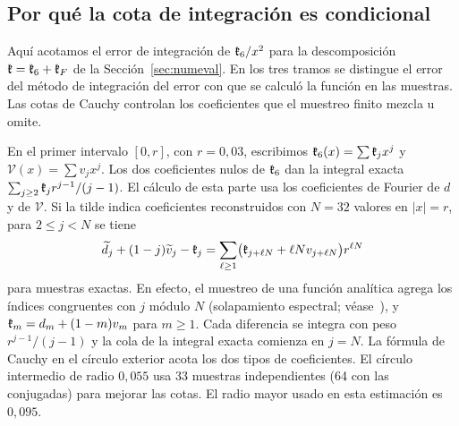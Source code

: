 \subsection{Por qué la cota de integración es condicional}
Aquí acotamos el error de integración de $\mathfrak{k}_6/x^2$ para la descomposición
 $\mathfrak{k}=\mathfrak{k}_6+\mathfrak{k}_F$ de la
Sección~\ref{sec:numeval}. En los tres tramos se distingue el error del método de integración del
error con que se calculó la función en las muestras. Las cotas de Cauchy controlan los coeficientes
que el muestreo finito mezcla u omite.

En el primer intervalo $[0,r]$, con $r=0{,}03$, escribimos $\mathfrak{k}_6(x)=\sum \mathfrak{k}_jx^j$ y $\mathcal
 V(x)=\sum
v_jx^j$. Los dos coeficientes nulos de $\mathfrak{k}_6$ dan la integral exacta
 $\sum_{j\ge2}\mathfrak{k}_jr^{j-1}/(j-1)$. El
cálculo de esta parte usa los coeficientes de Fourier de $d$ y de $\mathcal V$. Si la tilde indica
coeficientes reconstruidos con $N=32$ valores en $|x|=r$, para $2\le j<N$ se tiene
\[
 \widetilde d_j+(1-j)\widetilde v_j-\mathfrak{k}_j
   =\sum_{\ell\ge1}\bigl(\mathfrak{k}_{j+\ell N}+\ell N v_{j+\ell N}\bigr)r^{\ell N}
\]
para muestras exactas. En efecto, el muestreo de una función analítica agrega los índices
congruentes con $j$ módulo $N$ (solapamiento espectral; véase~\cite{tw}), y $\mathfrak{k}_m=d_m+(1-m)v_m$ para
$m\ge1$. Cada diferencia se integra con peso
$r^{j-1}/(j-1)$ y la cola de la integral exacta comienza en $j=N$. La fórmula de Cauchy en el círculo
exterior acota los dos tipos de coeficientes. El círculo intermedio de radio $0{,}055$ usa 33 muestras
independientes (64 con las conjugadas) para mejorar las cotas. El radio mayor usado en esta estimación
es $0{,}095$.

